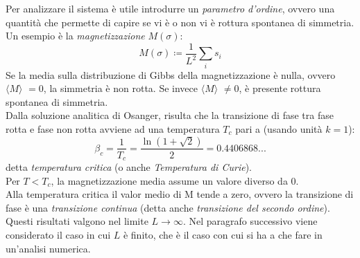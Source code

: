 \documentclass[10pt,a4paper]{article}
\begin{document}
Per analizzare il sistema è utile introdurre un \emph{parametro d'ordine}, ovvero una quantità che permette di capire se vi è o non vi è rottura spontanea di simmetria. Un esempio è la \emph{magnetizzazione} $M(\sigma)$:
\begin{equation}
	M(\sigma)\coloneqq\frac{1}{L^2}\sum_{i}s_i
	\label{eq:magn}
\end{equation}
Se la media sulla distribuzione di Gibbs della magnetizzazione è nulla, ovvero $\langle M \rangle $ $=0$, la simmetria è non rotta. Se invece $\langle M \rangle $ $\ne 0$, è presente rottura spontanea di simmetria.\\
Dalla soluzione analitica di Osanger, risulta che la transizione di fase tra fase rotta e fase non rotta avviene ad una temperatura $T_c$ pari a (usando unità $k=1$):
\begin{equation}
\beta_c=\frac{1}{T_c}=\frac{\ln(1+\sqrt{2})}{2}= 0.4406868\text{...}
\label{eq:temperatura-critica}
\end{equation}
detta \emph{temperatura critica} (o anche \emph{Temperatura di Curie}).\\
Per $T<T_c$, la magnetizzazione media assume un valore diverso da $0$. \\
Alla temperatura critica il valor medio di M tende a zero, ovvero la transizione di fase è una \emph{transizione continua} (detta anche \emph{transizione del secondo ordine}). Questi risultati valgono nel limite $L\rightarrow \infty$. Nel paragrafo successivo viene considerato il caso in cui $L$ è finito, che è il caso con cui si ha a che fare in un'analisi numerica.
\end{document}
